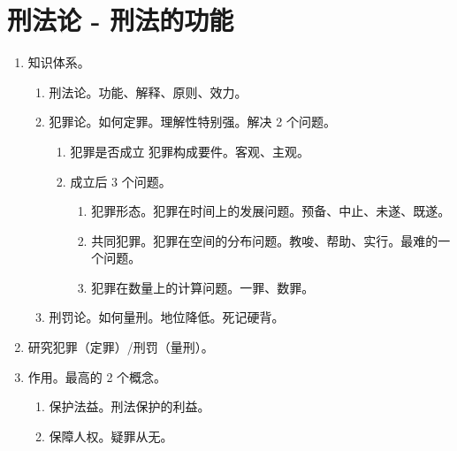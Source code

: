 \section{刑法论 - 刑法的功能}
\begin{enumerate}
  \item 知识体系。
        \begin{enumerate}
          \item 刑法论。功能、解释、原则、效力。
          \item 犯罪论。如何定罪。理解性特别强。解决 2 个问题。
                \begin{enumerate}
                  \item 犯罪是否成立 \yjt 犯罪构成要件。客观、主观。
                  \item 成立后 3 个问题。
                        \begin{enumerate}
                          \item 犯罪形态。犯罪在时间上的发展问题。预备、中止、未遂、既遂。
                          \item 共同犯罪。犯罪在空间的分布问题。教唆、帮助、实行。最难的一个问题。
                          \item 犯罪在数量上的计算问题。一罪、数罪。
                        \end{enumerate}
                \end{enumerate}
          \item 刑罚论。如何量刑。地位降低。死记硬背。
        \end{enumerate}
  \item 研究犯罪（定罪）/刑罚（量刑）。
  \item 作用。最高的 2 个概念。
        \begin{enumerate}
          \item 保护法益。刑法保护的利益。
          \item 保障人权。疑罪从无。
        \end{enumerate}
\end{enumerate}

